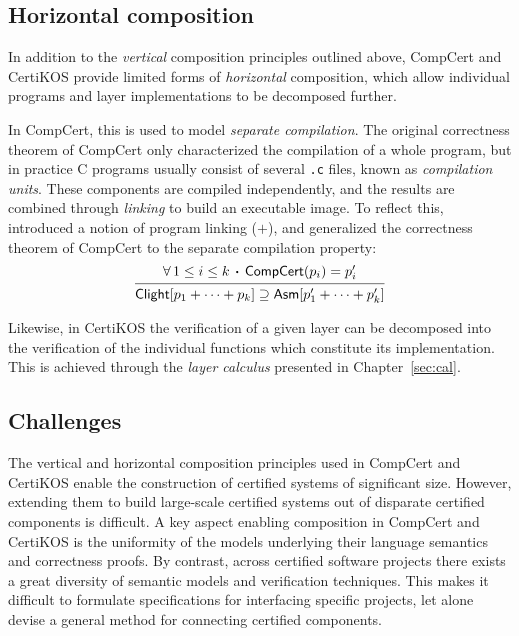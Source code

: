 \documentclass[11pt,oneside]{book}
\theoremstyle{definition}
\newcommand{\kw}[1]{\ensuremath{ \mathsf{#1} }}
\newcommand{\bdot}{\boldsymbol{\cdot}}
\begin{document}

\subsection{Horizontal composition} %

In addition to
the \emph{vertical} composition principles outlined above,
CompCert and CertiKOS provide limited forms of
\emph{horizontal} composition,
which allow individual programs and layer implementations
to be decomposed further.

In CompCert,
this is used to model \emph{separate compilation}.
The original correctness theorem of CompCert
only characterized the compilation of a whole program,
but in practice C programs usually consist of
several \texttt{.c} files, known as \emph{compilation units}.
These components are compiled independently,
and the results are combined through \emph{linking} to build
an executable image.
To reflect this,
\citet{sepcompcert}
introduced a notion of program linking ($+$), and
generalized the correctness theorem of CompCert
to the separate compilation property:
\[
  \begin{prooftree}
    \hypo{\forall \, 1 \le i \le k \, \bdot \,
      \kw{CompCert}(p_i) = p_i'}
    \infer1{\kw{Clight}[p_1 + \cdots + p_k] \supseteq
      \kw{Asm}[p_1' + \cdots + p_k']}
  \end{prooftree}
\]

Likewise,
in CertiKOS the verification of a given layer
can be decomposed into
the verification of the individual functions
which constitute its implementation.
This is achieved through the \emph{layer calculus}
presented in Chapter~\ref{sec:cal}.


\subsection{Challenges} %

The vertical and horizontal composition principles
used in CompCert and CertiKOS
enable the construction of certified systems
of significant size.
However, extending them to build large-scale certified systems
out of disparate certified components
is difficult.
A key aspect enabling composition in CompCert and CertiKOS
is the uniformity of the models underlying
their language semantics and correctness proofs.
By contrast,
across certified software projects
there exists a great diversity
of semantic models and verification techniques.
This makes it difficult to formulate
specifications for interfacing specific projects,
let alone devise a general method
for connecting certified components.
\end{document}
